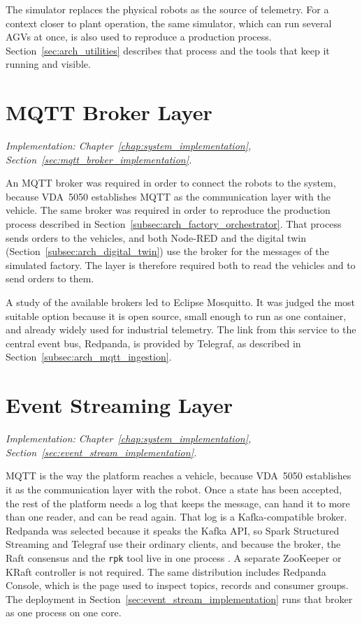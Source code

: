 The simulator replaces the physical robots as the source of telemetry. For a context closer to plant operation, the same simulator, which can run several AGVs at once, is also used to reproduce a production process. Section~\ref{sec:arch_utilities} describes that process and the tools that keep it running and visible.

\section{MQTT Broker Layer}
\label{sec:arch_mqtt}
\textit{Implementation: Chapter~\ref{chap:system_implementation}, Section~\ref{sec:mqtt_broker_implementation}.}

An MQTT broker was required in order to connect the robots to the system, because VDA~5050 establishes MQTT as the communication layer with the vehicle. The same broker was required in order to reproduce the production process described in Section~\ref{subsec:arch_factory_orchestrator}. That process sends orders to the vehicles, and both Node-RED and the digital twin (Section~\ref{subsec:arch_digital_twin}) use the broker for the messages of the simulated factory. The layer is therefore required both to read the vehicles and to send orders to them.

A study of the available brokers led to Eclipse Mosquitto. It was judged the most suitable option because it is open source, small enough to run as one container, and already widely used for industrial telemetry. The link from this service to the central event bus, Redpanda, is provided by Telegraf, as described in Section~\ref{subsec:arch_mqtt_ingestion}.

\section{Event Streaming Layer}
\label{sec:arch_event_streaming}
\textit{Implementation: Chapter~\ref{chap:system_implementation}, Section~\ref{sec:event_stream_implementation}.}

MQTT is the way the platform reaches a vehicle, because VDA~5050 establishes it as the communication layer with the robot. Once a state has been accepted, the rest of the platform needs a log that keeps the message, can hand it to more than one reader, and can be read again. That log is a Kafka-compatible broker. Redpanda was selected because it speaks the Kafka API, so Spark Structured Streaming and Telegraf use their ordinary clients, and because the broker, the Raft consensus and the \texttt{rpk} tool live in one process \cite{raftgithub}. A separate ZooKeeper or KRaft controller is not required. The same distribution includes Redpanda Console, which is the page used to inspect topics, records and consumer groups. The deployment in Section~\ref{sec:event_stream_implementation} runs that broker as one process on one core.

